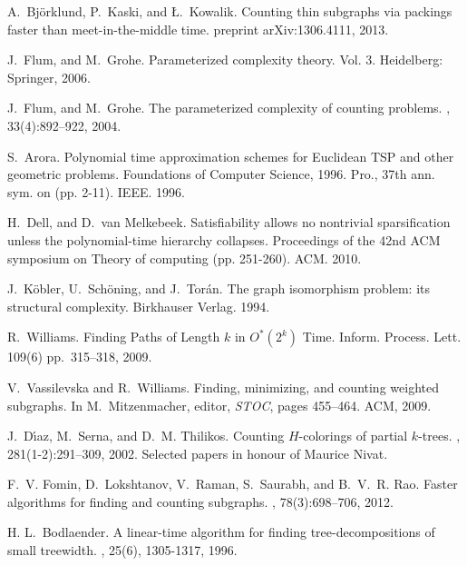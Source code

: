 \documentclass[a4paper,11pt]{report}
\theoremstyle{plain}
\theoremstyle{definition}
\begin{document}
\begin{thebibliography}{10}

A.~{Bj{\"o}rklund}, P.~Kaski, and {\L}.~Kowalik.
\newblock Counting thin subgraphs via packings faster than meet-in-the-middle time.
 preprint arXiv:1306.4111, 2013.

J.~Flum, and M.~Grohe.
\newblock Parameterized complexity theory.  Vol. 3.
\newblock Heidelberg: Springer, 2006.

J.~Flum, and M.~Grohe.
\newblock The parameterized complexity of counting problems.
, 33(4):892--922, 2004.

S.~Arora.
\newblock Polynomial time approximation schemes for Euclidean TSP and other geometric problems.
\newblock Foundations of Computer Science, 1996. Pro., 37th ann. sym. on (pp. 2-11). IEEE. 1996.

H.~Dell, and D.~van Melkebeek.
\newblock Satisfiability allows no nontrivial sparsification unless the polynomial-time hierarchy collapses.
\newblock Proceedings of the 42nd ACM symposium on Theory of computing (pp. 251-260). ACM. 2010.

J.~Köbler, U.~Schöning, and J.~Torán.
\newblock The graph isomorphism problem: its structural complexity.
\newblock Birkhauser Verlag. 1994.

R.~Williams.
\newblock Finding Paths of Length $k$ in $O^*(2^k)$ Time.
\newblock Inform. Process. Lett. 109(6) pp.~315--318, 2009.

V.~Vassilevska and R.~Williams.
\newblock Finding, minimizing, and counting weighted subgraphs.
\newblock In M.~Mitzenmacher, editor, {\em STOC}, pages 455--464. ACM, 2009.

J.~D{\'{\i}}az, M.~Serna, and D.~M. Thilikos.
\newblock Counting {$H$}-colorings of partial {$k$}-trees.
, 281(1-2):291--309, 2002.
\newblock Selected papers in honour of Maurice Nivat.

F.~V. Fomin, D.~Lokshtanov, V.~Raman, S.~Saurabh, and B.~V.~R. Rao.
\newblock Faster algorithms for finding and counting subgraphs.
, 78(3):698--706, 2012.

H. L.~Bodlaender.
\newblock A linear-time algorithm for finding tree-decompositions of small treewidth.
, 25(6), 1305-1317, 1996.


\end{thebibliography}
\end{document}
